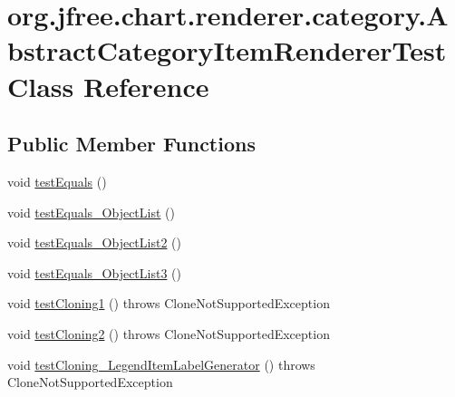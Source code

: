 \hypertarget{classorg_1_1jfree_1_1chart_1_1renderer_1_1category_1_1_abstract_category_item_renderer_test}{}\section{org.\+jfree.\+chart.\+renderer.\+category.\+Abstract\+Category\+Item\+Renderer\+Test Class Reference}
\label{classorg_1_1jfree_1_1chart_1_1renderer_1_1category_1_1_abstract_category_item_renderer_test}
\subsection*{Public Member Functions}
\begin{DoxyCompactItemize}
\item 
void \mbox{\hyperlink{classorg_1_1jfree_1_1chart_1_1renderer_1_1category_1_1_abstract_category_item_renderer_test_a9d692f8690ba5cec2261e696ccf7ef6f}{test\+Equals}} ()
\item 
void \mbox{\hyperlink{classorg_1_1jfree_1_1chart_1_1renderer_1_1category_1_1_abstract_category_item_renderer_test_ae717fa186c6ebd39638fb5990caa6ae9}{test\+Equals\+\_\+\+Object\+List}} ()
\item 
void \mbox{\hyperlink{classorg_1_1jfree_1_1chart_1_1renderer_1_1category_1_1_abstract_category_item_renderer_test_abb977be16b3c2444cff5fdd770c9880d}{test\+Equals\+\_\+\+Object\+List2}} ()
\item 
void \mbox{\hyperlink{classorg_1_1jfree_1_1chart_1_1renderer_1_1category_1_1_abstract_category_item_renderer_test_aa32c7214c7e9c2d1db0a5348192eb121}{test\+Equals\+\_\+\+Object\+List3}} ()
\item 
void \mbox{\hyperlink{classorg_1_1jfree_1_1chart_1_1renderer_1_1category_1_1_abstract_category_item_renderer_test_a5945d400967bf3f7bd8ff7688db508cf}{test\+Cloning1}} ()  throws Clone\+Not\+Supported\+Exception 
\item 
void \mbox{\hyperlink{classorg_1_1jfree_1_1chart_1_1renderer_1_1category_1_1_abstract_category_item_renderer_test_afa348242be6ade7dc7fe808c3a47db70}{test\+Cloning2}} ()  throws Clone\+Not\+Supported\+Exception 
\item 
void \mbox{\hyperlink{classorg_1_1jfree_1_1chart_1_1renderer_1_1category_1_1_abstract_category_item_renderer_test_af97169c04025ce5bd7aa30cd45418511}{test\+Cloning\+\_\+\+Legend\+Item\+Label\+Generator}} ()  throws Clone\+Not\+Supported\+Exception 

\end{DoxyCompactItemize}
